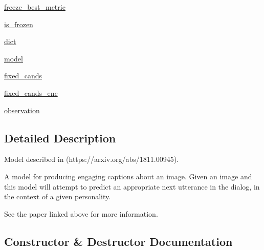 \begin{DoxyCompactItemize}
\item 
\hyperlink{classprojects_1_1personality__captions_1_1transresnet_1_1transresnet_1_1TransresnetAgent_a9a20b4821c3481f7a08bcc68df5f0fe3}{freeze\+\_\+best\+\_\+metric}
\item 
\hyperlink{classprojects_1_1personality__captions_1_1transresnet_1_1transresnet_1_1TransresnetAgent_a5bdf6e53f546563af9dd552536a5c023}{is\+\_\+frozen}
\item 
\hyperlink{classprojects_1_1personality__captions_1_1transresnet_1_1transresnet_1_1TransresnetAgent_aef1312ff6ea2ee58c245236114d19ecd}{dict}
\item 
\hyperlink{classprojects_1_1personality__captions_1_1transresnet_1_1transresnet_1_1TransresnetAgent_a8bdd596d3dabed6072c814db1f705b82}{model}
\item 
\hyperlink{classprojects_1_1personality__captions_1_1transresnet_1_1transresnet_1_1TransresnetAgent_a08427ced81096471bbe8eaa931c8d029}{fixed\+\_\+cands}
\item 
\hyperlink{classprojects_1_1personality__captions_1_1transresnet_1_1transresnet_1_1TransresnetAgent_a208f000d4bc99419aa38a1f4c86c12d2}{fixed\+\_\+cands\+\_\+enc}
\item 
\hyperlink{classprojects_1_1personality__captions_1_1transresnet_1_1transresnet_1_1TransresnetAgent_adc97f37e227519a48abbfaab4bdd7e92}{observation}
\end{DoxyCompactItemize}


\subsection{Detailed Description}
\begin{DoxyVerb}Model described in (https://arxiv.org/abs/1811.00945).

A model for producing engaging captions about an image. Given an image and
this model will attempt to predict an appropriate
next utterance in the dialog, in the context of a given personality.

See the paper linked above for more information.
\end{DoxyVerb}
 

\subsection{Constructor \& Destructor Documentation}
\mbox{\label{classprojects_1_1personality__captions_1_1transresnet_1_1transresnet_1_1TransresnetAgent_a0ef5e4216cb586b31414df5c0992269d}} 
